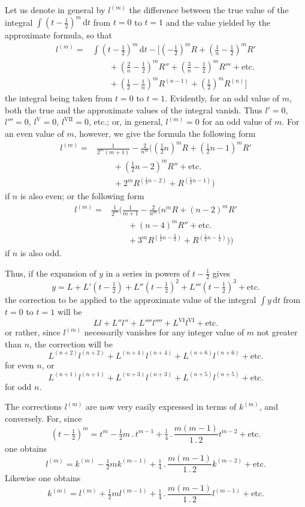 Let us denote in general by $l^{(m)}$ the difference between the true value of the integral $\int(t-\frac12)^m\,\mathrm{d}t$ from $t=0$ to $t=1$ and the value yielded by the approximate formula, so that
\[
\begin{aligned}
l^{(m)}={}&\int(t-\tfrac12)^m\,\mathrm{d}t
-\bigl[(-\tfrac12)^mR+(\tfrac1n-\tfrac12)^mR'
\\ &\qquad +(\tfrac2n-\tfrac12)^mR''+(\tfrac3n-\tfrac12)^mR'''+\text{etc.}\\
&\qquad +(\tfrac12-\tfrac1n)^mR^{(n-1)}+(\tfrac12)^mR^{(n)}\bigr]
\end{aligned}
\]
the integral being taken from $t=0$ to $t=1$. Evidently, for an odd value of $m$, both the true and the approximate values of the integral vanish. Thus $l'=0$, $l'''=0$, $l^{\mathrm{V}}=0$, $l^{\mathrm{VII}}=0$, etc.; or, in general, $l^{(m)}=0$ for an odd value of $m$. For an even value of $m$, however, we give the formula the following form
\[
\begin{aligned}
l^{(m)}={}&\frac1{2^m(m+1)}-\frac2{n^m}\bigl((\tfrac12n)^mR
+(\tfrac12n-1)^mR'\\ &\qquad +(\tfrac12n-2)^mR''+\text{etc.}\\
&\qquad +2^mR^{(\frac12n-2)}+R^{(\frac12n-1)}\bigr)
\end{aligned}
\]
if $n$ is also even; or the following form
\[
\begin{aligned}
l^{(m)}={}&\frac1{2^m}\bigl(\frac1{m+1}-\frac2{n^m}\bigl(n^mR
+(n-2)^mR'\\ &\qquad +(n-4)^mR''+\text{etc.}\\
&\qquad +3^mR^{(\frac12n-\frac32)}+R^{(\frac12n-\frac12)}\bigr)\bigr)
\end{aligned}
\]
if $n$ is also odd.
\par{}
Thus, if the expansion of $y$ in a series in powers of $t-\frac12$ gives
\[
y=L+L'(t-\tfrac12)+L''(t-\tfrac12)^2+L'''(t-\tfrac12)^3+\text{etc.}
\]
the correction to be applied to the approximate value of the integral $\int y\,\mathrm{d}t$ from $t=0$ to $t=1$ will be
\[
Ll+L''l''+L''''l''''+L^{\mathrm{VI}}l^{\mathrm{VI}}+\text{etc.}
\]
or rather, since $l^{(m)}$ necessarily vanishes for any integer value of $m$ not greater than $n$, the correction will be
\[
L^{(n+2)}l^{(n+2)}+L^{(n+4)}l^{(n+4)}+L^{(n+6)}l^{(n+6)}+\text{etc.}
\]
for even $n$, or
\[
L^{(n+1)}l^{(n+1)}+L^{(n+3)}l^{(n+3)}+L^{(n+5)}l^{(n+5)}+\text{etc.}
\]
for odd $n$.

The corrections $l^{(m)}$ are now very easily expressed in terms of $k^{(m)}$, and conversely. For, since
\[
(t-\tfrac12)^m=t^m-\tfrac12m\mathbin{.}t^{m-1}
+\tfrac14\mathbin{.}\frac{m(m-1)}{1\mathbin{.}2}t^{m-2}+\text{etc.}
\]
one obtains
\[
l^{(m)}=k^{(m)}-\tfrac12m k^{(m-1)}
+\tfrac14\mathbin{.}\frac{m(m-1)}{1\mathbin{.}2}k^{(m-2)}+\text{etc.}
\]
Likewise one obtains
\[
k^{(m)}=l^{(m)}+\tfrac12m l^{(m-1)}
+\tfrac14\mathbin{.}\frac{m(m-1)}{1\mathbin{.}2}l^{(m-1)}+\text{etc.}
\]



